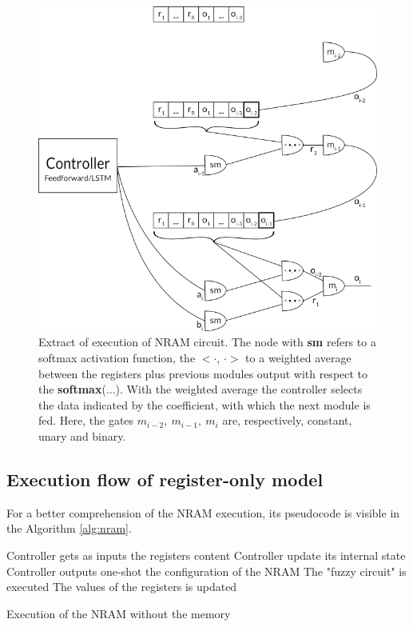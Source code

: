 \begin{figure}[h!]
	\centering
	\includegraphics[width=\textwidth]{figures/register-only-model.png}
	\caption{Extract of execution of NRAM circuit. The node with \textbf{sm} refers to a softmax activation function, the $<\cdot$, $\cdot>$ to a weighted average between the registers plus previous modules output with respect to the \textbf{softmax}($\dots$). With the weighted average the controller selects the data indicated by the coefficient, with which the next module is fed. Here, the gates $m_{i-2},\ m_{i-1},\ m_{i}$ are, respectively, constant, unary and binary.}
	\label{fig:register-only-model}
\end{figure}

\subsection{Execution flow of register-only model}\label{subsec:execution-register-only}
For a better comprehension of the NRAM execution, its pseudocode is visible in the Algorithm \ref{alg:nram}.
\begin{algorithm}
	\begin{algorithmic}[1]
		\label{lst:nram:line-5}
			\State Controller gets as inputs the registers content\label{lst:nram:line-6}
				\State Controller update its internal state
			\EndIf
			\State Controller outputs one-shot the configuration of the NRAM 
			\label{lst:nram:line-8}
			\State The "fuzzy circuit" is executed \label{lst:nram:line-9}
			\State The values of the registers is updated\label{lst:nram:line-10}
		\EndFor
	\end{algorithmic}
	\caption{Execution of the NRAM without the memory}\label{alg:nram}
\end{algorithm}


